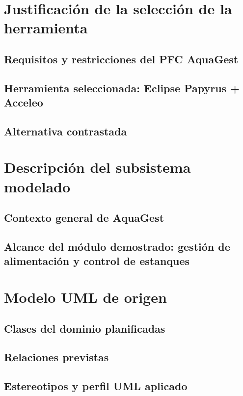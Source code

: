 \documentclass[11pt,a4paper]{article}
\begin{document}
\section{Justificación de la selección de la herramienta}

\subsection{Requisitos y restricciones del PFC AquaGest}

\subsection{Herramienta seleccionada: Eclipse Papyrus + Acceleo}

\subsection{Alternativa contrastada}

\section{Descripción del subsistema modelado}

\subsection{Contexto general de AquaGest}

\subsection{Alcance del módulo demostrado: gestión de alimentación y control de estanques}

\section{Modelo UML de origen}
\label{sec:modelo_uml}

\subsection{Clases del dominio planificadas}

\subsection{Relaciones previstas}

\subsection{Estereotipos y perfil UML aplicado}
\end{document}
